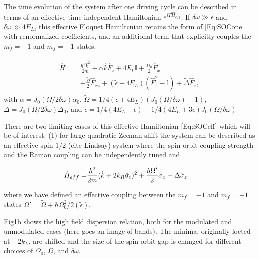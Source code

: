 The time evolution of the system after one driving cycle can be described in terms of an effective time-independent Hamiltonian $e^{iT\hat{H}_{eff}}$. If $\delta\omega \gg \epsilon$ and $\delta\omega \gg 4E_L$, this effective Floquet Hamiltonian retains the form of \ref{Eq:SOCone} with renormalized coefficients, and an additional term that explicitly couples the $m_f=-1$ and $m_f=+1$ states:

\begin{align}
	\begin{split}
		\hat{H} = &\frac{\hbar^2\hat{k}^2}{2m} + \alpha\hat{k}\hat{F}_z +4E_L\mathbb{I} + \frac{\Omega_0}{2}\hat{F}_x \\
		&+ \frac{\tilde{\Omega}}{2}\hat{F}_{xz} +(\tilde{\epsilon}+4E_L)(\hat{F}_z^2-\mathbb{I}) +\tilde{\Delta}\hat{F}_z, 
		\label{Eq:SOCeff}
	\end{split}
\end{align}	
%
with $\alpha= J_0(\Omega/2\delta\omega)\alpha_0$, $\tilde{\Omega}=1/4(\epsilon+4E_L) (J_0(\Omega/\delta\omega)-1)$, $\Delta=J_0(\Omega/2\delta\omega)\Delta_0$, and $\tilde{\epsilon}= 1/4(4E_L-\epsilon) - 
1/4(4E_L + 3 \epsilon) J_0( \Omega/\delta\omega)$


There are two limiting cases of this effective Hamiltonian \ref{Eq:SOCeff} which will be of interest: (1) for large quadratic Zeeman shift the system can be described as an effective spin $1/2$ (cite Lindsay) system where the spin orbit coupling strength and the Raman coupling can be independently tuned and 




\begin{align}
	\begin{split}
		\hat{H}_{eff} = & \frac{\hbar^2}{2m}(\hat{k}+2{{k_R}}\hat{\sigma}_z)^2 + \frac{\hbar\Omega'}{2}\hat{\sigma}_x  +\Delta\hat{\sigma}_z  
		\label{Eq:SOChalf}
	\end{split}
\end{align}	

where we have defined an effective coupling between the $m_f=-1$ and $m_f=+1$ states $\Omega'=\tilde{\Omega}+\hbar\Omega_0^2/2(\tilde{\epsilon})$. 


Fig1b shows the high field dispersion relation, both for the modulated and unmodulated cases (here goes an image of bands). The minima, originally locted at $\pm2 k_L$, are shifted and the size of the spin-orbit gap is changed for different choices of $\Omega_0$, $\Omega$, and $\delta\omega$.  








